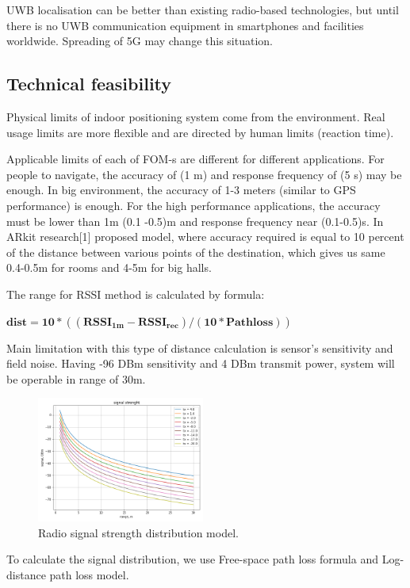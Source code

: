 UWB localisation can be better than existing radio-based technologies, but until there is no UWB communication equipment in smartphones and facilities worldwide. Spreading of 5G may change this situation.
%

\subsection{Technical feasibility}

Physical limits of indoor positioning system come from the environment. Real usage limits are more flexible and are directed by human limits (reaction time).

Applicable limits of each of FOM-s are different for different applications. For people to navigate, the accuracy of (1 m) and response frequency of (5 s)  may be enough. In big environment, the accuracy of 1-3 meters (similar to GPS performance) is enough. For the high performance applications, the accuracy must be lower than 1m (0.1 -0.5)m and response frequency near (0.1-0.5)s. In ARkit research[1] proposed model, where accuracy required is equal to 10 percent of the distance between various points of the destination, which gives us same 0.4-0.5m for rooms and 4-5m for big halls.


The range for RSSI method is calculated by formula:

$\mathbf{ dist = 10 * ((RSSI_{1m} - RSSI_{rec})/(10 * Path loss)) }$

Main limitation with this type of distance calculation is sensor's sensitivity and field noise. Having -96 DBm sensitivity and 4 DBm transmit power, system will be operable in range of 30m.

\begin{figure}
  \includegraphics[width=0.49\textwidth]{img/signal_strenght.png}
  \caption{Radio signal strength distribution model.}
  \label{fig:signal}
\end{figure}
To calculate the signal distribution, we use Free-space path loss formula and Log-distance path loss model.

